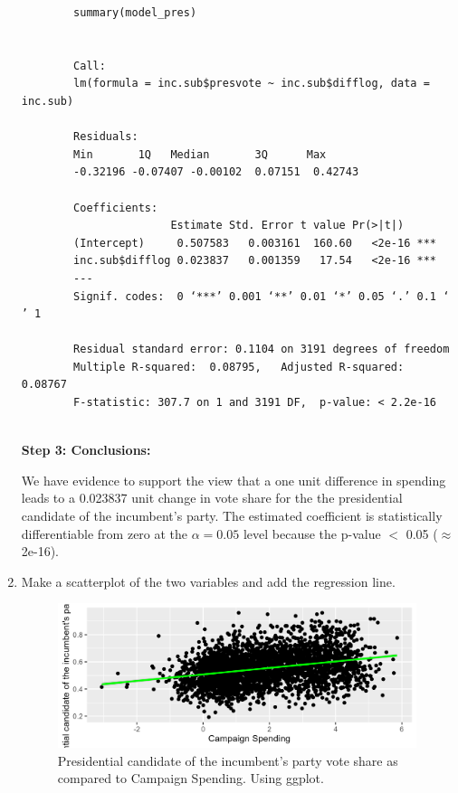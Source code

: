 \documentclass[12pt,letterpaper]{article}
\begin{document}
\begin{enumerate}
		\begin{verbatim}
		summary(model_pres)

			
		Call:
		lm(formula = inc.sub$presvote ~ inc.sub$difflog, data = inc.sub)
		
		Residuals:
		Min       1Q   Median       3Q      Max 
		-0.32196 -0.07407 -0.00102  0.07151  0.42743 
		
		Coefficients:
		               Estimate Std. Error t value Pr(>|t|)    
		(Intercept)     0.507583   0.003161  160.60   <2e-16 ***
		inc.sub$difflog 0.023837   0.001359   17.54   <2e-16 ***
		---
		Signif. codes:  0 ‘***’ 0.001 ‘**’ 0.01 ‘*’ 0.05 ‘.’ 0.1 ‘ ’ 1
		
		Residual standard error: 0.1104 on 3191 degrees of freedom
		Multiple R-squared:  0.08795,	Adjusted R-squared:  0.08767 
		F-statistic: 307.7 on 1 and 3191 DF,  p-value: < 2.2e-16
	
		\end{verbatim}
		
		\textbf{Step 3: Conclusions:}
		
		We have evidence to support the view that a one unit difference in spending leads to a 0.023837 unit change in vote share for the the presidential candidate of the incumbent's party. The estimated coefficient is statistically differentiable from zero at the $\alpha=0.05$ level because the p-value $<$ 0.05 ($\approx $2e-16). \\
		
		
		\item Make a scatterplot of the two variables and add the regression line. 	
		
		  
		
		\begin{figure}[h!]
			\centering
			\caption{\footnotesize Presidential candidate of the incumbent's party vote share as compared to Campaign Spending. Using ggplot.}
			\includegraphics[width=0.99\textwidth]{vote_share_pres_scatter.png}
			

\end{figure}
\end{enumerate}
\end{document}
